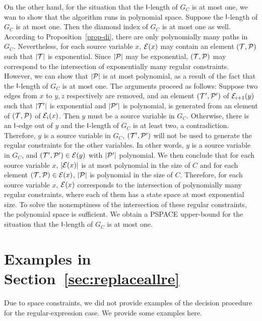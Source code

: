 On the other hand, for the situation that the $\mathsf{l}$-length of $G_C$ is at most one, we wan to show that the algorithm runs in polynomial space. Suppose the $\mathsf{l}$-length of $G_C$ is at most one. Then the diamond index of $G_C$ is at most one as well. According to Proposition~\ref{prop-di}, there are only polynomially many paths in $G_C$. Nevertheless, for each source variable $x$, $\mathcal{E}(x)$ may contain an element $(\mathcal{T},\mathcal{P})$ such that $|\mathcal{T}|$ is exponential. Since $|\mathcal{P}|$ may be exponential, $(\mathcal{T},\mathcal{P})$ may correspond to the intersection of exponentially many regular constraints. However, we can show that $|\mathcal{P}|$ is at most polynomial, as a result of the fact that the $\mathsf{l}$-length of $G_C$ is at most one. The arguments proceed as follows: Suppose two edges from $x$ to $y, z$ respectively are removed, and an element $(\mathcal{T}', \mathcal{P}')$ of $\mathcal{E}_{i+1}(y)$ such that $|\mathcal{T}'|$ is exponential and $|\mathcal{P}'|$ is polynomial, is generated from an element of $(\mathcal{T}, \mathcal{P})$ of $\mathcal{E}_i(x)$. Then $y$ must be a source variable in $G_C$. Otherwise, there is an $\mathsf{l}$-edge out of $y$ and the $\mathsf{l}$-length of $G_C$ is at least two, a contradiction. Therefore, $y$ is a source variable in $G_C$, $(\mathcal{T}', \mathcal{P}')$  will not be used to generate the regular constraints for the other variables. In other words, $y$ is a source variable in $G_C$, and $(\mathcal{T}', \mathcal{P}') \in \mathcal{E}(y)$ with $|\mathcal{P}'|$ polynomial. We then conclude that for each source variable $x$, $|\mathcal{E}(x)|$  is at most polynomial in the size of $C$ and for each element $(\mathcal{T}, \mathcal{P}) \in \mathcal{E}(x)$, $|\mathcal{P}|$ is polynomial in the size of $C$. Therefore, for each source variable $x$,  $\mathcal{E}(x)$ corresponds to the intersection of polynomially many regular constraints, where each of them has a state space at most exponential size. To solve the nonemptiness of the intersection of these regular constraints, the polynomial space is sufficient. We obtain a PSPACE upper-bound for the situation that the $\mathsf{l}$-length of $G_C$ is at most one.


\def\refsecreplaceallre{\ref{sec:replaceallre}}
\section{Examples in Section~\protect\refsecreplaceallre}

Due to space constraints, we did not provide examples of the decision procedure for the regular-expression case.
We provide some examples here.


